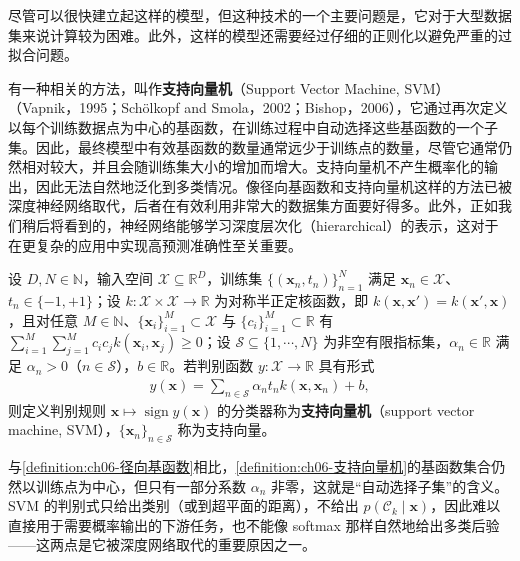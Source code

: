 \documentclass[../../main.tex]{subfiles}
\begin{document}
尽管可以很快建立起这样的模型，但这种技术的一个主要问题是，它对于大型数据集来说计算较为困难。此外，这样的模型还需要经过仔细的正则化以避免严重的过拟合问题。

有一种相关的方法，叫作\textbf{支持向量机}（Support Vector Machine, SVM）（Vapnik，1995；Schölkopf and Smola，2002；Bishop，2006），它通过再次定义以每个训练数据点为中心的基函数，在训练过程中自动选择这些基函数的一个子集。因此，最终模型中有效基函数的数量通常远少于训练点的数量，尽管它通常仍然相对较大，并且会随训练集大小的增加而增大。支持向量机不产生概率化的输出，因此无法自然地泛化到多类情况。像径向基函数和支持向量机这样的方法已被深度神经网络取代，后者在有效利用非常大的数据集方面要好得多。此外，正如我们稍后将看到的，神经网络能够学习深度层次化（hierarchical）的表示，这对于在更复杂的应用中实现高预测准确性至关重要。

\begin{definition}[支持向量机]\label{definition:ch06-支持向量机}
设 $D,N\in\mathbb{N}$，输入空间 $\mathcal{X}\subseteq\mathbb{R}^{D}$，训练集 $\{(\boldsymbol{x}_{n},t_{n})\}_{n=1}^{N}$ 满足 $\boldsymbol{x}_{n}\in\mathcal{X}$、$t_{n}\in\{-1,+1\}$；设 $k:\mathcal{X}\times\mathcal{X}\to\mathbb{R}$ 为对称半正定核函数，即 $k(\boldsymbol{x},\boldsymbol{x}')=k(\boldsymbol{x}',\boldsymbol{x})$，且对任意 $M\in\mathbb{N}$、$\{\boldsymbol{x}_{i}\}_{i=1}^{M}\subset\mathcal{X}$ 与 $\{c_{i}\}_{i=1}^{M}\subset\mathbb{R}$ 有 $\sum_{i=1}^{M}\sum_{j=1}^{M}c_{i}c_{j}k(\boldsymbol{x}_{i},\boldsymbol{x}_{j})\geqslant0$；设 $\mathcal{S}\subseteq\{1,\cdots,N\}$ 为非空有限指标集，$\alpha_{n}\in\mathbb{R}$ 满足 $\alpha_{n}>0$（$n\in\mathcal{S}$），$b\in\mathbb{R}$。若判别函数 $y:\mathcal{X}\to\mathbb{R}$ 具有形式
\begin{align}
y(\boldsymbol{x})=\sum_{n\in\mathcal{S}}\alpha_n t_n k(\boldsymbol{x},\boldsymbol{x}_n)+b,
\label{align:ch06-支持向量机}
\end{align}
则定义判别规则 $\boldsymbol{x}\mapsto\operatorname{sign}y(\boldsymbol{x})$ 的分类器称为\textbf{支持向量机}（support vector machine, SVM），$\{\boldsymbol{x}_{n}\}_{n\in\mathcal{S}}$ 称为支持向量。
\end{definition}

\begin{remark}与\cref{definition:ch06-径向基函数}相比，\cref{definition:ch06-支持向量机}的基函数集合仍然以训练点为中心，但只有一部分系数 $\alpha_n$ 非零，这就是“自动选择子集”的含义。SVM 的判别式只给出类别（或到超平面的距离），不给出 $p(\mathcal{C}_k\mid\boldsymbol{x})$，因此难以直接用于需要概率输出的下游任务，也不能像 softmax 那样自然地给出多类后验——这两点是它被深度网络取代的重要原因之一。
\end{remark}
\end{document}
